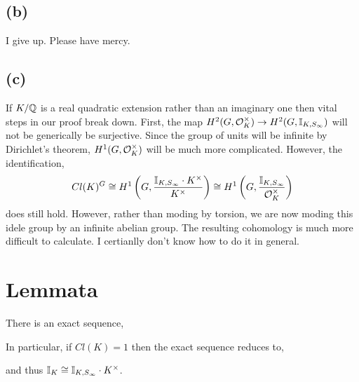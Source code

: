 \documentclass[12pt]{extarticle}
\begin{document}
\subsection*{(b)}

I give up. Please have mercy. 

\subsection*{(c)}

If $K/\mathbb{Q}$ is a real quadratic extension rather than an imaginary one then vital steps in our proof break down. First, the map $H^2(G, \mathcal{O}_{K}^\times) \to H^2(G, \mathbb{I}_{K, S_{\infty}})$ will not be generically be surjective. Since the group of units will be infinite by Dirichlet's theorem, $H^1(G, \mathcal{O}_{K}^\times)$ will be much more complicated. However, the identification,
\[ Cl(K)^G \cong  H^1\left(G, \frac{\mathbb{I}_{K, S_\infty} \cdot K^\times}{K^\times}\right) \cong H^1\left(G, \frac{\mathbb{I}_{K, S_\infty}}{\mathcal{O}_{K}^\times}\right) \]
does still hold. However, rather than moding by torsion, we are now moding this idele group by an infinite abelian group. The resulting cohomology is much more difficult to calculate. I certianlly don't know how to do it in general. 

\newpage

\section{Lemmata}

\begin{lemma} \label{idele_ideal}
There is an exact sequence,
\begin{center}
\end{center}
In particular, if $Cl(K) = 1$ then the exact sequence reduces to,
\begin{center}
\end{center}
and thus $\mathbb{I}_{K} \cong \mathbb{I}_{K, S_\infty} \cdot K^\times$. 
\end{lemma}
\end{document}
